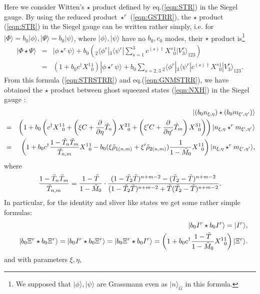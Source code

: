 \documentclass[12pt,a4paper]{article}
\def\T{{\tilde T}}
\def\M0{{\tilde M}_0}
\begin{document}
Here we consider Witten's $\star$ product defined by eq.(\ref{eqn:STR}) in the Siegel gauge.
By using the reduced product $\star^r$ (\ref{eqn:GSTRR}), the $\star$ product (\ref{eqn:STR}) in the Siegel gauge can be written rather simply, i.e. for $|\Phi\rangle=b_0|\phi\rangle,|\Psi\rangle=b_0|\psi\rangle$, where $|\phi\rangle,|\psi\rangle$ have no $b_0,c_0$ modes, their $\star$ product is\footnote{
	We supposed that $|\phi\rangle,|\psi\rangle$ are Grassmann even as $|n\rangle_G$ in this formula.
}
\begin{eqnarray}
\label{eqn:STRSTRR}
|\Phi\star\Psi\rangle&=&|\phi\star^r\psi\rangle+b_0\left({}_2\langle\phi^r|{}_3\langle\psi^r|\sum_{s=1}^3c^{(s)\dagger}X^s{}^1_0|V_3^r\rangle_{123}\right)\nonumber \\
&=&(1+b_0c^\dagger X^1{}^1_0)|\phi\star^r\psi\rangle+b_0\sum_{s=2,3} {}_2\langle\phi^r |{}_3\langle\psi^r|c^{(s)\dagger}X^s{}^1_0 |V^r_3\rangle_{123} .
\end{eqnarray}
From this formula (\ref{eqn:STRSTRR}) and eq.(\ref{eqn:GNMSTRR}), we have obtained the $\star$ product between ghost squeezed states (\ref{eqn:NXH}) in the Siegel gauge :
\begin{eqnarray}
&&|(b_0 n_{\xi,\eta})\star(b_0 m_{\xi',\eta'})\rangle\nonumber \\
&=&\left(1+b_0\left(c^\dagger X^1{}^1_0+\left(\xi C+{\partial\over\partial\eta}\T_n\right)X^2{}^1_0
+\left(\xi'C+{\partial\over\partial\eta'}\T_m\right)X^3{}^1_0\right)\right)|n_{\xi,\eta}\star^r m_{\xi',\eta'}\rangle\nonumber \\
&=&\left(1+b_0c^\dagger{1-\T_n \T_m\over\T_{n,m}}X^1{}^1_0-b_0(\xi{\tilde \rho}_{1(n,m)}+\xi'{\tilde \rho}_{2(n,m)}){1\over1-\M0 }X^1{}^1_0\right)|n_{\xi,\eta}\star^r m_{\xi',\eta'}\rangle,
\end{eqnarray}
where
\begin{equation}
{1-\T_n \T_m\over\T_{n,m}}={1-\T \over1-\M0 } \cdot {(1-\T_2\T)^{n+m-2}-(\T_2- \T )^{n+m-2} \over (1-\T_2 \T)^{n+m-2}+\T (\T_2- \T )^{n+m-2}}.
\end{equation}
In particular, for the identity and sliver like states we get some rather simple formulas:
\begin{eqnarray}
&&|b_0I^r\star b_0I^r\rangle=|I^r\rangle,\nonumber \\
&&|b_0\Xi^r\star b_0\Xi^r\rangle=|b_0I^r\star b_0\Xi^r\rangle=|b_0\Xi^r\star b_0I^r\rangle=\left(1+b_0c^\dagger{1-\T \over1-\M0 }X^1{}^1_0\right)|\Xi^r\rangle.
\end{eqnarray}
and with parameters $\xi,\eta$,
\end{document}
